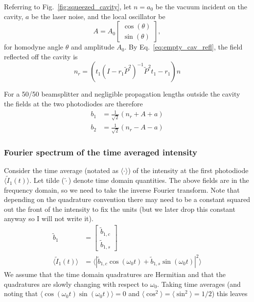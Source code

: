 \documentclass[aps,pra,superscriptaddress,reprint,nofootinbib]{revtex4-1}
\newcommand{\abs}[1]{\left\lvert #1 \right\rvert}
\newcommand{\expect}[1]{\langle #1 \rangle}
\begin{document}
Referring to Fig.~\ref{fig:squeezed_cavity}, let $n = a_0$ be the vacuum incident on the cavity, $a$ be the laser noise, and the local oscillator be
\begin{equation}
A = A_0 \begin{bmatrix}
\cos(\theta)\\ 
\sin(\theta)
\end{bmatrix},
\end{equation}
for homodyne angle $\theta$ and amplitude $A_0$. By Eq.~\ref{eq:empty_cav_refl}, the field reflected off the cavity is
\begin{equation}
n_r = \left(t_1 (I - r_1 \tilde{P}^2)^{-1} \tilde{P}^2 t_1 - r_1 \right) n
\end{equation}


For a 50/50 beamsplitter and negligible propagation lengths outside the cavity the fields at the two photodiodes are therefore
\begin{align}
b_1 &= \frac{1}{\sqrt{2}} \left( n_r + A + a\right) \\
b_2 &= \frac{1}{\sqrt{2}} \left( n_r - A - a\right)\nonumber
\end{align}

\subsubsection{Fourier spectrum of the time averaged intensity}

Consider the time average (notated as $\expect{\cdot}$) of the intensity at the first photodiode $\expect{\tilde{I}_1(t)}$. Let tilde ($\tilde{\cdot}$) denote time domain quantities. The above fields are in the frequency domain, so we need to take the inverse Fourier transform. Note that depending on the quadrature convention there may need to be a constant squared out the front of the intensity to fix the units (but we later drop this constant anyway so I will not write it). 
\begin{align}
\tilde{b}_1 &= \begin{bmatrix}
\tilde{b}_{1,c}\\ 
\tilde{b}_{1,s}
\end{bmatrix} \\
\expect{\tilde{I}_1(t)} &= \expect{\abs{\tilde{b}_{1,c} \cos(\omega_0 t) + \tilde{b}_{1,s} \sin(\omega_0 t)}^2}
\end{align}
We assume that the time domain quadratures are Hermitian and that the quadratures are slowly changing with respect to $\omega_0$. Taking time averages (and noting that $\expect{\cos(\omega_0 t) \sin(\omega_0 t)} = 0$ and $\expect{\cos^2} = \expect{\sin^2} = 1/2$) this leaves
\end{document}

